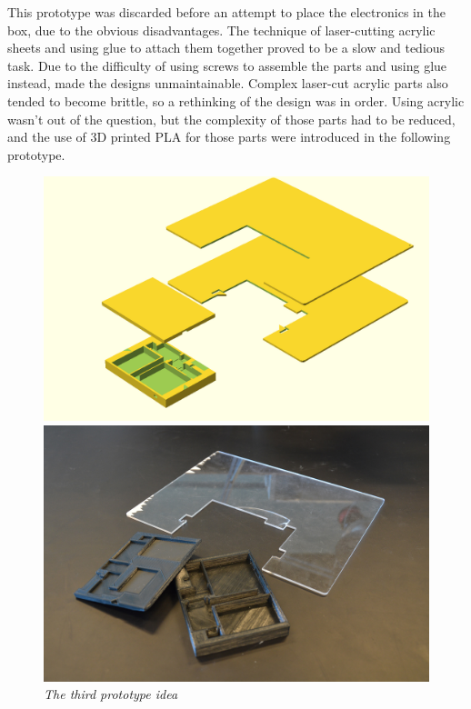This prototype was discarded before an attempt to place the electronics in the box, due to the obvious disadvantages. The technique of laser-cutting acrylic sheets and using glue to attach them together proved to be a slow and tedious task. Due to the difficulty of using screws to assemble the parts and using glue instead, made the designs unmaintainable. Complex laser-cut acrylic parts also tended to become brittle, so a rethinking of the design was in order. Using acrylic wasn't out of the question, but the complexity of those parts had to be reduced, and the use of 3D printed PLA for those parts were introduced in the following prototype. \\


\begin{figure}[h]
\begin{minipage}[b]{7.5cm}
\centering
\includegraphics[scale=0.235]{figures/iterations/v4.png}
\end{minipage}
\begin{minipage}[b]{7.5cm}
\centering
\includegraphics[scale=0.58]{figures/iterations/v4-photo.jpg}
\end{minipage}
\caption{\small {\it {The third prototype idea}}} \label{fig:v3}
\end{figure}

